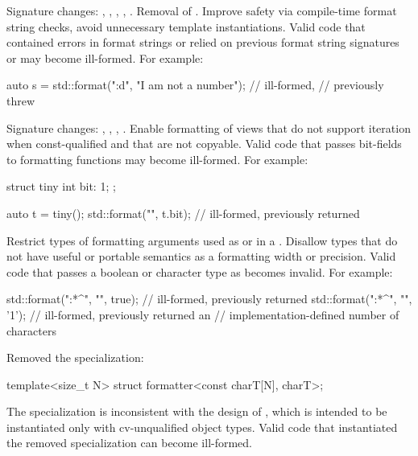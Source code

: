 \change
Signature changes: , , ,
, .
Removal of .
\rationale
Improve safety via compile-time format string checks,
avoid unnecessary template instantiations.
\effect
Valid \CppXX{} code that
contained errors in format strings or
relied on previous format string signatures or
 may become ill-formed.
For example:
\begin{codeblock}
auto s = std::format("{:d}", "I am not a number");      // ill-formed,
                                                        // previously threw 
\end{codeblock}

\change
Signature changes: , , ,
.
\rationale
Enable formatting of views
that do not support iteration when const-qualified and
that are not copyable.
\effect
Valid \CppXX{} code that passes bit-fields to formatting functions
may become ill-formed.
For example:
\begin{codeblock}
struct tiny {
  int bit: 1;
};

auto t = tiny();
std::format("{}", t.bit);       // ill-formed, previously returned 
\end{codeblock}

\change
Restrict types of formatting arguments
used as  or  in
a .
\rationale
Disallow types that do not have useful or portable semantics as
a formatting width or precision.
\effect
Valid \CppXX{} code that passes a boolean or character type as
 becomes invalid.
For example:
\begin{codeblock}
std::format("{:*^{}}", "", true);   // ill-formed, previously returned 
std::format("{:*^{}}", "", '1');    // ill-formed, previously returned an
                                    // implementation-defined number of  characters
\end{codeblock}

\change
Removed the  specialization:
\begin{codeblock}
template<size_t N> struct formatter<const charT[N], charT>;
\end{codeblock}
\rationale
The specialization is inconsistent with the design of ,
which is intended to be instantiated only with cv-unqualified object types.
\effect
Valid \CppXX{} code that instantiated the removed specialization
can become ill-formed.

